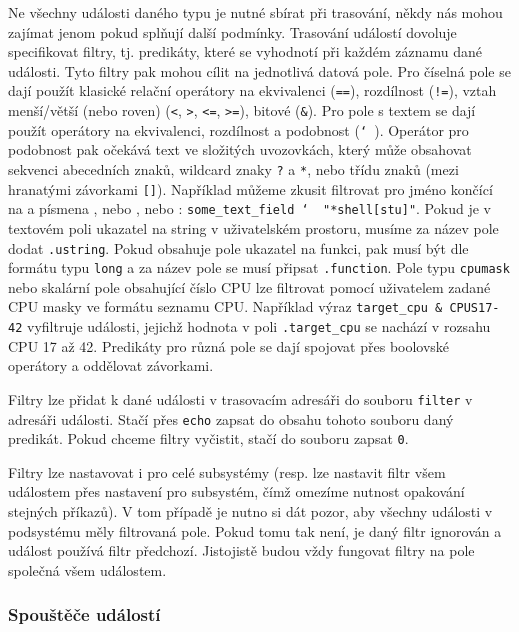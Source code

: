 Ne všechny události daného typu je nutné sbírat při trasování, někdy nás mohou zajímat jenom pokud splňují další podmínky. Trasování událostí dovoluje specifikovat filtry, tj. predikáty, které se vyhodnotí při každém záznamu dané události. Tyto filtry pak mohou cílit na jednotlivá datová pole. Pro číselná pole se dají použít klasické relační operátory na ekvivalenci (\texttt{==}), rozdílnost (\texttt{!=}), vztah menší/větší (nebo roven) (\texttt{<}, \texttt{>}, \texttt{<=}, \texttt{>=}), bitové  (\texttt{\&}). Pro pole s textem se dají použít operátory na ekvivalenci, rozdílnost a podobnost (\texttt{\char`~}). Operátor pro podobnost pak očekává text ve složitých uvozovkách, který může obsahovat sekvenci abecedních znaků, wildcard znaky \texttt{?} a \texttt{*}, nebo třídu znaků (mezi hranatými závorkami \texttt{[]}). Například můžeme zkusit filtrovat pro jméno končící na  a písmena , nebo , nebo : \texttt{some\_text\_field \char`~~"*shell[stu]"}.
Pokud je v textovém poli ukazatel na string v uživatelském prostoru, musíme za název pole dodat \texttt{.ustring}. Pokud obsahuje pole ukazatel na funkci, pak musí být dle formátu typu \texttt{long} a za název pole se musí připsat \texttt{.function}. Pole typu \texttt{cpumask} nebo skalární pole obsahující číslo CPU lze filtrovat pomocí uživatelem zadané CPU masky ve formátu seznamu CPU. Například výraz \texttt{target\_cpu \& CPUS{17-42}} vyfiltruje události, jejichž hodnota v poli \texttt{.target\_cpu} se nachází v rozsahu CPU 17 až 42. Predikáty pro různá pole se dají spojovat přes boolovské operátory a oddělovat závorkami.

Filtry lze přidat k dané události v trasovacím adresáři do souboru \texttt{filter} v adresáři události. Stačí přes \texttt{echo} zapsat do obsahu tohoto souboru daný predikát. Pokud chceme filtry vyčistit, stačí do souboru zapsat \texttt{0}.

Filtry lze nastavovat i pro celé subsystémy (resp. lze nastavit filtr všem událostem přes nastavení pro subsystém, čímž omezíme nutnost opakování stejných příkazů). V tom případě je nutno si dát pozor, aby všechny události v podsystému měly filtrovaná pole. Pokud tomu tak není, je daný filtr ignorován a událost používá filtr předchozí. Jistojistě budou vždy fungovat filtry na pole společná všem událostem.

\subsubsection*{Spouštěče událostí}

